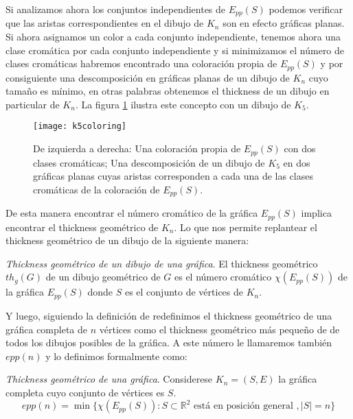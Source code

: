 Si analizamos ahora los conjuntos independientes de $E_{pp}(S)$ podemos verificar
que las aristas correspondientes en el dibujo de $K_n$ son en efecto gráficas planas.
Si ahora asignamos un color a cada conjunto independiente, tenemos ahora una clase
cromática por cada conjunto independiente y si minimizamos el número de clases cromáticas
habremos encontrado una coloración propia de $E_{pp}(S)$ y por consiguiente una descomposición
en gráficas planas de un dibujo de $K_n$ cuyo tamaño es mínimo, en otras palabras obtenemos
el thickness de un dibujo en particular de $K_n$. La figura \ref{fig:k5coloring}
ilustra este concepto con un dibujo de $K_5$.

\begin{figure}
  \centering
  \texttt{[image: k5coloring]}
  \caption{De izquierda a derecha: Una coloración propia de $E_{pp}(S)$ con dos
  clases cromáticas; Una descomposición de un dibujo de $K_5$ en dos gráficas planas
  cuyas aristas corresponden a cada una de las clases cromáticas de la coloración
  de $E_{pp}(S)$.}
  \label{fig:k5coloring}
\end{figure}

De esta manera encontrar el número cromático de la gráfica $E_{pp}(S)$ implica
encontrar el thickness geométrico de $K_n$. Lo que nos permite replantear el thickness
geométrico de un dibujo de la siguiente manera:
\begin{definition}{\emph{Thickness geométrico de un dibujo de una gráfica}.}
  El thickness geométrico $th_g(G)$ de un dibujo geométrico de $G$ es el número cromático
  $\chi(E_{pp}(S))$ de la gráfica $E_{pp}(S)$ donde $S$ es el conjunto de vértices de $K_n$.
\end{definition}
Y luego, siguiendo la definición de \cite{Dillencourt2004} redefinimos el thickness
geométrico de una gráfica completa de $n$ vértices como el thickness geométrico
más pequeño de de todos los dibujos posibles de la gráfica.
A este número le llamaremos también $epp(n)$ y lo definimos formalmente como:
\begin{definition}{\emph{Thickness geométrico de una gráfica}.}
  Considerese $K_n=(S,E)$ la gráfica completa cuyo conjunto de vértices es $S$.
  \[epp(n) = \min\{ \chi(E_{pp}(S)): S \subset \mathbb{R}^2 \text{ está en posición general }, |S|=n \}\]
\end{definition}


